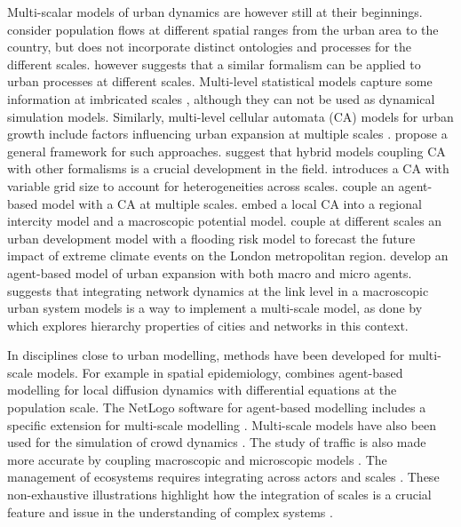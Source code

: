 \documentclass[referee,lineno,pdflatex,sn-apa]{sn-jnl}
\begin{document}
Multi-scalar models of urban dynamics are however still at their beginnings. \cite{murcio2015urban} consider population flows at different spatial ranges from the urban area to the country, but does not incorporate distinct ontologies and processes for the different scales. \cite{batty2005agents} however suggests that a similar formalism can be applied to urban processes at different scales. Multi-level statistical models capture some information at imbricated scales \citep{shu2020modelling}, although they can not be used as dynamical simulation models. Similarly, multi-level cellular automata (CA) models for urban growth include factors influencing urban expansion at multiple scales \citep{xu2019directional}. \cite{cheng2003modelling} propose a general framework for such approaches. \cite{torrens2001cellular} suggest that hybrid models coupling CA with other formalisms is a crucial development in the field. \cite{white2006modeling} introduces a CA with variable grid size to account for heterogeneities across scales. \cite{zhu2020dynamic} couple an agent-based model with a CA at multiple scales. \cite{yu2018modeling} embed a local CA into a regional intercity model and a macroscopic potential model. \cite{ford2019multi} couple at different scales an urban development model with a flooding risk model to forecast the future impact of extreme climate events on the London metropolitan region. \cite{xu2020urban} develop an agent-based model of urban expansion with both macro and micro agents. \cite{raimbault:halshs-02013006} suggests that integrating network dynamics at the link level in a macroscopic urban system models is a way to implement a multi-scale model, as done by \cite{raimbault2020hierarchy} which explores hierarchy properties of cities and networks in this context.

In disciplines close to urban modelling, methods have been developed for multi-scale models. For example in spatial epidemiology, \cite{banos2015importance} combines agent-based modelling for local diffusion dynamics with differential equations at the population scale. The NetLogo software for agent-based modelling includes a specific extension for multi-scale modelling \cite{hjorth2020levelspace}. Multi-scale models have also been used for the simulation of crowd dynamics \cite{crociani2016multi}. The study of traffic is also made more accurate by coupling macroscopic and microscopic models \cite{boulet2020coupling}. The management of ecosystems  requires integrating across actors and scales \cite{belem2013organizational}. These non-exhaustive illustrations highlight how the integration of scales is a crucial feature and issue in the understanding of complex systems \cite{chavalarias2009french}.
\end{document}
